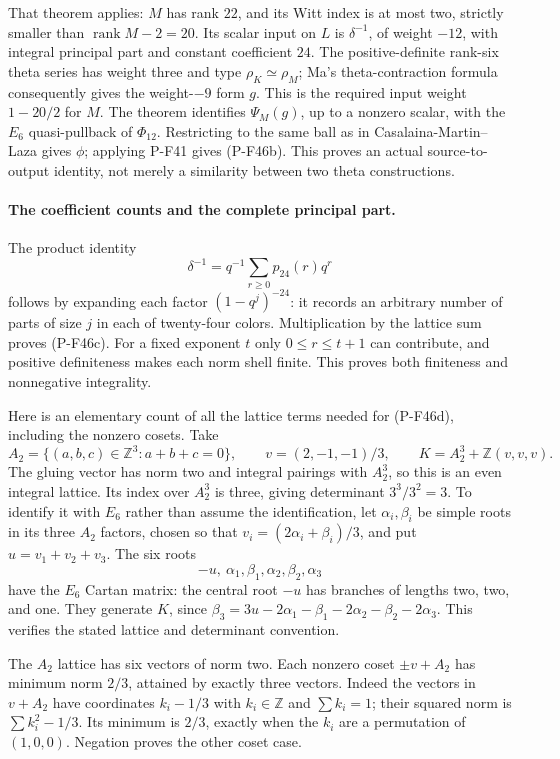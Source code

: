 That theorem applies: $M$ has rank $22$, and its
Witt index is at most two, strictly smaller than
$\operatorname{rank}M-2=20$. Its scalar input on
$L$ is $\delta^{-1}$, of weight $-12$, with
integral principal part and constant coefficient
$24$. The positive-definite rank-six theta series
has weight three and type $\rho_K\simeq\rho_M$;
Ma's theta-contraction formula consequently gives
the weight-$-9$ form $g$. This is the required
input weight $1-20/2$ for $M$.
The theorem identifies $\Psi_M(g)$, up to a
nonzero scalar, with the $E_6$ quasi-pullback of
$\Phi_{12}$. Restricting to the same ball as in
Casalaina-Martin--Laza gives $\phi$; applying
P-F41 gives (P-F46b). This proves an actual
source-to-output identity, not merely a similarity
between two theta constructions.

\paragraph{The coefficient counts and the complete principal part.}
The product identity
\[
             \delta^{-1}=q^{-1}
                    \sum_{r\ge0}p_{24}(r)q^r
\]
follows by expanding each factor $(1-q^j)^{-24}$:
it records an arbitrary number of parts of size $j$
in each of twenty-four colors. Multiplication by
the lattice sum proves (P-F46c). For a fixed exponent
$t$ only $0\le r\le t+1$ can contribute, and
positive definiteness makes each norm shell finite.
This proves both finiteness and nonnegative integrality.

Here is an elementary count of all the lattice terms
needed for (P-F46d), including the nonzero cosets.
Take
\[
 A_2=\{(a,b,c)\in\mathbb Z^3:a+b+c=0\},
 \qquad v=(2,-1,-1)/3,
 \qquad
 K=A_2^3+\mathbb Z(v,v,v).
 \tag{P-F46f}
\]
The gluing vector has norm two and integral pairings
with $A_2^3$, so this is an even integral lattice.
Its index over $A_2^3$ is three, giving determinant
$3^3/3^2=3$. To identify it with $E_6$ rather than
assume the identification, let $\alpha_i,\beta_i$
be simple roots in its three $A_2$ factors, chosen
so that $v_i=(2\alpha_i+\beta_i)/3$, and put
$u=v_1+v_2+v_3$.
The six roots
\[
             -u,\ \alpha_1,\beta_1,\alpha_2,\beta_2,\alpha_3
\]
have the $E_6$ Cartan matrix: the central root $-u$
has branches of lengths two, two, and one.
They generate $K$, since
$\beta_3=3u-2\alpha_1-\beta_1-2\alpha_2-\beta_2-2\alpha_3$.
This verifies the stated lattice and determinant convention.

The $A_2$ lattice has six vectors of norm two.
Each nonzero coset $\pm v+A_2$ has minimum norm
$2/3$, attained by exactly three vectors.
Indeed the vectors in $v+A_2$ have coordinates
$k_i-1/3$ with $k_i\in\mathbb Z$ and $\sum k_i=1$;
their squared norm is $\sum k_i^2-1/3$.
Its minimum is $2/3$, exactly when the $k_i$ are
a permutation of $(1,0,0)$. Negation proves the
other coset case.

